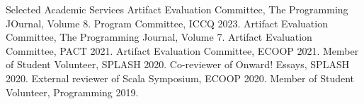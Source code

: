 \begin{rubric}{Selected Academic Services}
  \entry*[2023] Artifact Evaluation Committee, The Programming JOurnal, Volume 8.
  \entry*[2023] Program Committee, ICCQ 2023.
  \entry*[2022] Artifact Evaluation Committee, The Programming Journal, Volume 7.
  \entry*[2021] Artifact Evaluation Committee, PACT 2021.
  \entry*[2021] Artifact Evaluation Committee, ECOOP 2021.
  \entry*[2020] Member of Student Volunteer, SPLASH 2020.
  \entry*[2020] Co-reviewer of Onward! Essays, SPLASH 2020.
  \entry*[2020] External reviewer of Scala Symposium, ECOOP 2020.
  \entry*[2019] Member of Student Volunteer, Programming 2019.
\end{rubric}
